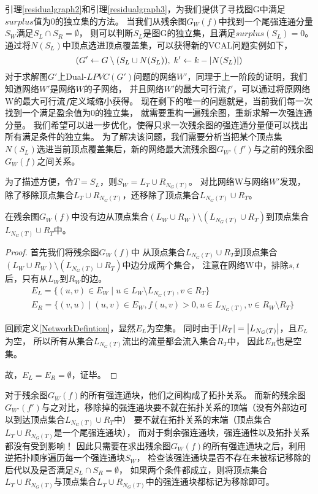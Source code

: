 引理\ref{residualgraph2}和引理\ref{residualgraph3}，为我们提供了寻找图G中满足$surplus$值为0的独立集的方法。
当我们从残余图$G_W(f)$中找到一个尾强连通分量$S_W$满足$S_L \cap S_R = \emptyset$，
则可以判断$S_L$是图G的独立集，且满足$surplus(S_L) = 0$。
通过将$N(S_L)$中顶点选进顶点覆盖集，可以获得新的VCAL问题实例如下，
\[(G' \leftarrow G \setminus (S_L \cup N(S_L)),\; k' \leftarrow k - \left\vert N(S_L) \right\vert)\]
对于求解图$G'$上Dual-$LPVC(G')$问题的网络$W'$，同理于上一阶段的证明，我们知道网络$W'$是网络$W$的子网络，
并且网络$W'$的最大可行流$f'$，可以通过将原网络W的最大可行流$f$定义域缩小获得。
现在剩下的唯一的问题就是，当前我们每一次找到一个满足盈余值为0的独立集，
就需要重构一遍残余图，重新求解一次强连通分量。
我们希望可以进一步优化，使得只求一次残余图的强连通分量便可以找出所有满足条件的独立集。
为了解决该问题，我们需要分析当把某个顶点集$N(S_L)$选进当前顶点覆盖集后，新的网络最大流残余图$G_{W'}(f')$与之前的残余图$G_W(f)$之间关系。

为了描述方便，令$T = S_L$，则$S_W = L_T \cup R_{N_G(T)}$。
对比网络W与网络$W'$发现，除了移除顶点集合$L_T \cup R_{N_G(T)}$，还移除了顶点集合$L_{N_G(T)} \cup R_T$。

\begin{claim}
在残余图$G_W(f)$中没有边从顶点集合$(L_W \cup R_W) \setminus (L_{N_G(T)} \cup R_T)$到顶点集合$L_{N_G(T)} \cup R_T$中。
\end{claim}
\begin{proof}
首先我们将残余图$G_W(f)$中
从顶点集合$L_{N_G(T)} \cup R_T$到顶点集合$(L_W \cup R_W) \setminus (L_{N_G(T)} \cup R_T)$中边分成两个集合，
注意在网络W中，排除$s, t$后，只有从$L_W$到$R_W$的边。
  \begin{equation*} \begin{aligned}
    & E_L = \{(u, v) \in E_W\;|\;u \in L_W \setminus L_{N_G(T)},v \in R_T\} \\
    & E_R = \{(v, u)\;|\;(u, v) \in E_W,f(u, v) > 0,u \in L_{N_G(T)},v \in R_W \setminus R_T\}
  \end{aligned} \end{equation*}

回顾定义\ref{NetworkDefintion}，显然$E_L$为空集。
同时由于$\left\vert R_T \right\vert = \left\vert L_{N_G(T)} \right\vert$，且$E_L$为空，
所以所有从集合$L_{N_G(T)}$流出的流量都会流入集合$R_T$中，
因此$E_R$也是空集。

故，$E_L = E_R = \emptyset$，证毕。
\end{proof}

对于残余图$G_W(f)$的所有强连通块，他们之间构成了拓扑关系。
而新的残余图$G_{W'}(f')$与之对比，移除掉的强连通块要不就在拓扑关系的顶端（没有外部边可以到达顶点集合$L_{N_G(T)} \cup R_T$中）
要不就在拓扑关系的末端（顶点集合$L_T \cup R_{N_G(T)}$是一个尾强连通块），
而对于剩余强连通块，强连通性以及拓扑关系都没有受到影响！
因此只需要在求出残余图$G_W(f)$的所有强连通块之后，利用逆拓扑顺序遍历每一个强连通块$S_W$，
检查该强连通块是否不存在未被标记移除的后代以及是否满足$S_L \cap S_R = \emptyset$，
如果两个条件都成立，则将顶点集合$L_T \cup R_{N_G(T)}$与顶点集合$L_T \cup R_{N_G(T)}$中的强连通块都标记为移除即可。

